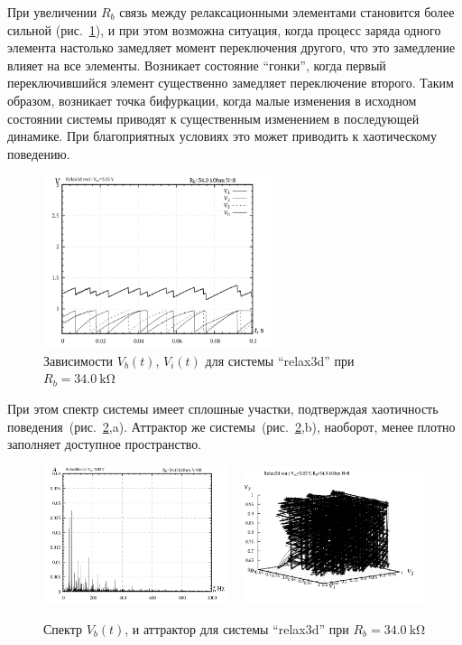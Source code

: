 При увеличении $R_b$ связь между релаксационными элементами становится более сильной
(рис.~\ref{atu:f:relax3d_t_08}), и при этом возможна ситуация, когда
процесс заряда одного элемента настолько замедляет момент переключения другого,
что это замедление влияет на все элементы. Возникает состояние ``гонки'',
когда первый переключившийся элемент существенно замедляет переключение второго.
Таким образом, возникает точка бифуркации, когда малые изменения
в исходном состоянии системы приводят к существенным изменением в последующей динамике.
При благоприятных условиях это может приводить к хаотическому поведению.


\begin{figure}[htb!]
  \centerline{\includegraphics[width=0.6\textwidth]{p/relax3d_t_08.png} }
  \caption{Зависимости $V_b(t)$, $V_i(t)$ для системы ``relax3d'' при $R_b=\SI{34.0}{\kilo\ohm}$ }
  \label{atu:f:relax3d_t_08}
\end{figure}

При этом спектр системы имеет сплошные участки, подтверждая
хаотичность поведения~(рис.~\ref{atu:f:relax3d_f_08},a).
Аттрактор же системы~(рис.~\ref{atu:f:relax3d_f_08},b),
наоборот, менее плотно заполняет доступное пространство.

\begin{figure}[htb!]
  \centerline{
    \includegraphics[width=0.48\textwidth]{p/relax3d_f_08.png}
    ~
    \includegraphics[width=0.48\textwidth]{p/relax3d_v1v2v3_08.png}
  }
  \caption{Спектр $V_b(t)$, и аттрактор для системы ``relax3d'' при $R_b=\SI{34.0}{\kilo\ohm}$ }
  \label{atu:f:relax3d_f_08}
\end{figure}

